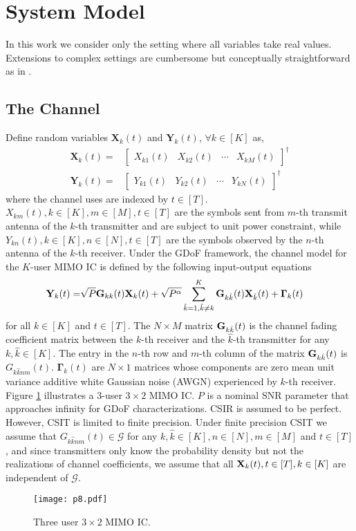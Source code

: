 \documentclass[11pt]{article}
\begin{document}
\section{System Model} {\label{sec-sys}}
In this work we consider only the setting where all variables take real values. Extensions to complex settings are cumbersome but conceptually straightforward  as in \cite{Arash_Jafar_PN}.
\subsection{The Channel}
\noindent Define  random variables $\mathbf{X}_{k}(t)$ and $\mathbf{Y}_{k}(t)$, $\forall k\in[K]$ as,
\begin{align}
\mathbf{X}_{k}(t)=&\begin{bmatrix}{X}_{k1}(t)&{X}_{k2}(t)&\cdots&{X}_{kM}(t)\end{bmatrix}^\dagger\\
\mathbf{Y}_{k}(t)=&\begin{bmatrix}{Y}_{k1}(t)&{Y}_{k2}(t)&\cdots&{Y}_{kN}(t)\end{bmatrix}^\dagger
\end{align}
where the channel uses are indexed by $t\in[T]$. $X_{km}(t), k\in[K],m\in[M],t\in[T]$ are the symbols sent from $m$-th transmit antenna of the $k$-th transmitter and are subject to unit power constraint, while $Y_{kn}(t), k\in[K],n\in[N],t\in[T]$ are the symbols observed by the $n$-th antenna of the $k$-th receiver. Under the GDoF framework, the channel model for the $K$-user MIMO IC is defined by the following input-output equations
\begin{align}
{\bf Y}_{k}(t)=&\sqrt{P}{\bf G}_{kk}(t)\mathbf{X}_k(t)+\sqrt{{P}^{\alpha}}\sum_{\hat{k}=1,\hat{k}\neq k}^K{\bf G}_{k\hat{k}}(t)\mathbf{X}_{\hat{k}}(t)+{\bf \Gamma}_{k}(t)
\end{align}
for all $k\in[K]$ and $t\in[T]$. The $N\times M$ matrix ${\bf G}_{k\hat{k}}(t)$ is the channel fading coefficient matrix between the $k$-th receiver and the $\hat{k}$-th transmitter for any $k,\hat{k}\in[K]$. The entry in the $n$-th row and $m$-th column of the matrix ${\bf G}_{k\hat{k}}(t)$ is ${G}_{k\hat{k}nm}(t)$. $\mathbf{\Gamma}_{k}(t)$ are  $N\times 1$  matrices whose components are zero mean unit variance additive white Gaussian noise (AWGN) experienced by $k$-th receiver.  Figure \ref{Fig1rr} illustrates a $3$-user $3\times 2$ MIMO IC.  $P$ is a nominal SNR parameter that approaches infinity for GDoF characterizations. CSIR is assumed to be perfect. However, CSIT is limited to finite precision. Under finite precision CSIT  we assume that $G_{k\hat{k}nm}(t)\in\mathcal{G}$ for any $k,\hat{k}\in[K],n\in[N],m\in[M]$ and $t\in[T]$, and since transmitters only know the probability density but not the realizations of channel coefficients, we assume that all ${\bf X}_k(t), t\in[T], k\in[K]$ are independent of $\mathcal{G}$.
\begin{figure}[tp]
\centering 
\texttt{[image: p8.pdf]}
\caption{Three user $3 \times 2$ MIMO IC.}
\label{Fig1rr}
\end{figure}
\end{document}
